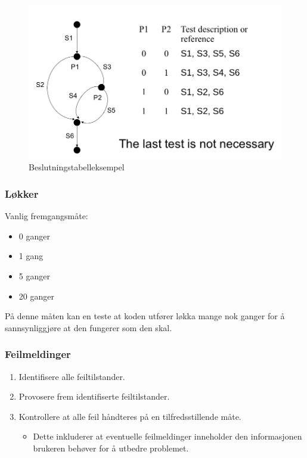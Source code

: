 \begin{figure}[htbp]
\centering
\includegraphics{Forelesning 06/img/1.png}
\caption{Beslutningstabelleksempel}
\end{figure}

\subsubsection{Løkker}

Vanlig fremgangsmåte:

\begin{itemize}
\item
  0 ganger
\item
  1 gang
\item
  5 ganger
\item
  20 ganger
\end{itemize}
På denne måten kan en teste at koden utfører løkka mange nok ganger for
å sannsynliggjøre at den fungerer som den skal.

\subsubsection{Feilmeldinger}

\begin{enumerate}[1.]
\item
  Identifisere alle feiltilstander.
\item
  Provosere frem identifiserte feiltilstander.
\item
  Kontrollere at alle feil håndteres på en tilfredsstillende måte.
  \begin{itemize}
  \item
    Dette inkluderer at eventuelle feilmeldinger inneholder den
    informasjonen brukeren behøver for å utbedre problemet.
  \end{itemize}
\end{enumerate}
